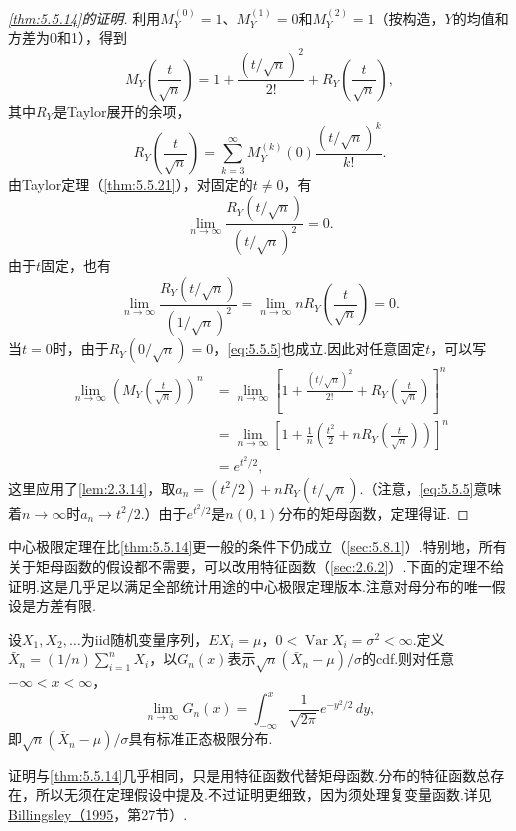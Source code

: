 \begin{proof}[\autoref{thm:5.5.14}的证明]
利用$M_Y^{(0)}=1$、$M_Y^{(1)}=0$和$M_Y^{(2)}=1$（按构造，$Y$的均值和方差为0和1），得到
\begin{equation}\label{eq:5.5.4}
M_Y\left(\frac t{\sqrt n}\right)=1+\frac{(t/\sqrt n)^2}{2!}+R_Y\left(\frac t{\sqrt n}\right),
\end{equation}
其中$R_Y$是Taylor展开的余项，
$$R_Y\left(\frac t{\sqrt n}\right)=\sum_{k=3}^\infty M_Y^{(k)}(0)\frac{(t/\sqrt n)^k}{k!}.$$
由Taylor定理（\autoref{thm:5.5.21}），对固定的$t\ne0$，有
$$\lim_{n\to\infty}\frac{R_Y(t/\sqrt n)}{(t/\sqrt n)^2}=0.$$
由于$t$固定，也有
\begin{equation}\label{eq:5.5.5}
\lim_{n\to\infty}\frac{R_Y(t/\sqrt n)}{(1/\sqrt n)^2}=\lim_{n\to\infty}nR_Y\left(\frac t{\sqrt n}\right)=0.
\end{equation}
当$t=0$时，由于$R_Y(0/\sqrt n)=0$，\eqref{eq:5.5.5}也成立.因此对任意固定$t$，可以写
\begin{equation}\label{eq:5.5.6}
\begin{aligned}
\lim_{n\to\infty}\left(M_Y\left(\frac t{\sqrt n}\right)\right)^n
&=\lim_{n\to\infty}\left[1+\frac{(t/\sqrt n)^2}{2!}+R_Y\left(\frac t{\sqrt n}\right)\right]^n\\
&=\lim_{n\to\infty}\left[1+\frac1n\left(\frac{t^2}2+nR_Y\left(\frac t{\sqrt n}\right)\right)\right]^n\\
&=e^{t^2/2},
\end{aligned}
\end{equation}
这里应用了\autoref{lem:2.3.14}，取$a_n=(t^2/2)+nR_Y(t/\sqrt n)$.（注意，\eqref{eq:5.5.5}意味着$n\to\infty$时$a_n\to t^2/2$.）由于$e^{t^2/2}$是$n(0,1)$分布的矩母函数，定理得证.
\end{proof}
中心极限定理在比\autoref{thm:5.5.14}更一般的条件下仍成立（\autoref{sec:5.8.1}）.特别地，所有关于矩母函数的假设都不需要，可以改用特征函数（\autoref{sec:2.6.2}）.下面的定理不给证明.这是几乎足以满足全部统计用途的中心极限定理版本.注意对母分布的唯一假设是方差有限.
\begin{theorem}[更强形式的中心极限定理]\label{thm:5.5.15}
设$X_1,X_2,\ldots$为iid随机变量序列，$EX_i=\mu$，$0<\operatorname{Var}X_i=\sigma^2<\infty$.定义$\bar X_n=(1/n)\sum_{i=1}^nX_i$，以$G_n(x)$表示$\sqrt n(\bar X_n-\mu)/\sigma$的cdf.则对任意$-\infty<x<\infty$，
$$\lim_{n\to\infty}G_n(x)=\int_{-\infty}^x\frac1{\sqrt{2\pi}}e^{-y^2/2}\,dy,$$
即$\sqrt n(\bar X_n-\mu)/\sigma$具有标准正态极限分布.
\end{theorem}
证明与\autoref{thm:5.5.14}几乎相同，只是用特征函数代替矩母函数.分布的特征函数总存在，所以无须在定理假设中提及.不过证明更细致，因为须处理复变量函数.详见\hyperref[bib:source33]{Billingsley（1995}，第27节）.

